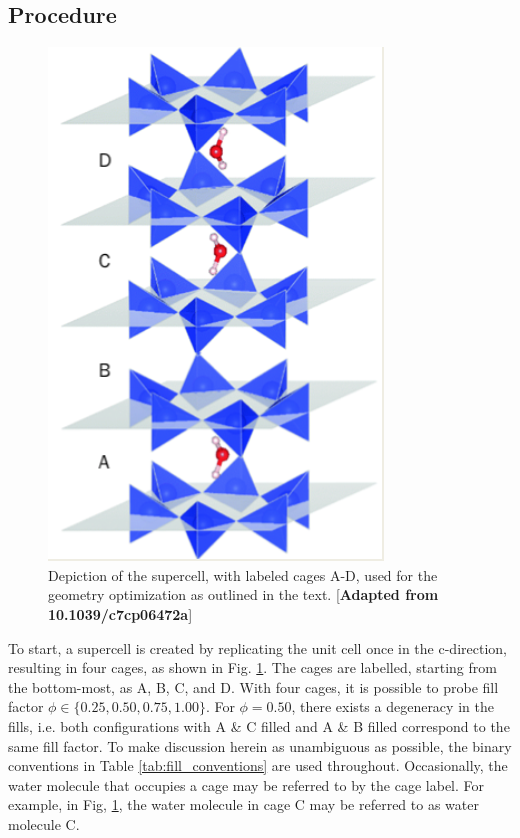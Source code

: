        \subsection{Procedure}
        
        \begin{figure}
            \centering
            \includegraphics{Figures/System/geometry_supercell.png}
            \caption{Depiction of the supercell, with labeled cages A-D, used for the geometry optimization as outlined in the text. [\textbf{Adapted from 10.1039/c7cp06472a}]}
            \label{fig:geom_supercell}
        \end{figure}
        
        To start, a supercell is created by replicating the unit cell once in the c-direction, resulting in four cages, as shown in Fig. \ref{fig:geom_supercell}. The cages are labelled, starting from the bottom-most, as A, B, C, and D. With four cages, it is possible to probe fill factor $\phi \in \{0.25,0.50,0.75,1.00 \}$. For $\phi=0.50$, there exists a degeneracy in the fills, i.e. both configurations with A \& C filled and A \& B filled correspond to the same fill factor. To make discussion herein as unambiguous as possible, the binary conventions in Table \ref{tab:fill_conventions} are used throughout. Occasionally, the water molecule that occupies a cage may be referred to by the cage label. For example, in Fig, \ref{fig:geom_supercell}, the water molecule in cage C may be referred to as water molecule C. 
        
